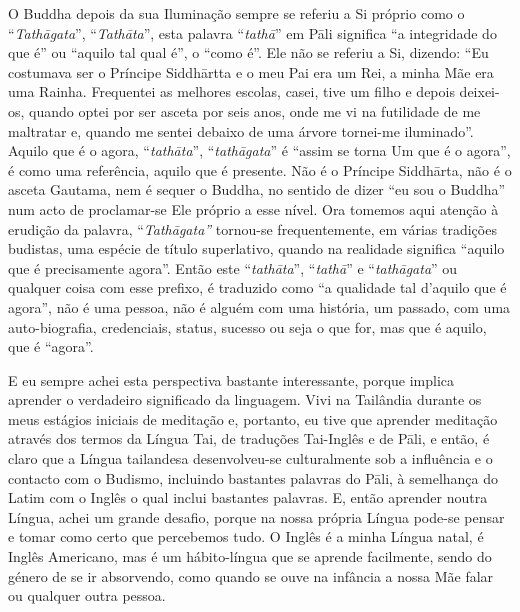 O Buddha depois da sua Iluminação sempre se referiu a Si próprio como o
``\emph{Tathāgata}'', ``\emph{Tathāta}'', esta palavra ``\emph{tathā}''
em Pāli significa ``a integridade do que é'' ou ``aquilo tal qual é'', o
``como é''. Ele não se referiu a Si, dizendo: ``Eu costumava ser o
Príncipe Siddhārtta e o meu Pai era um Rei, a minha Mãe era uma Rainha.
Frequentei as melhores escolas, casei, tive um filho e depois deixei-os,
quando optei por ser asceta por seis anos, onde me vi na futilidade de
me maltratar e, quando me sentei debaixo de uma árvore tornei-me
iluminado''. Aquilo que é o agora, ``\emph{tathāta}'',
``\emph{tathāgata}'' é ``assim se torna Um que é o agora'', é como uma
referência, aquilo que é presente. Não é o Príncipe Siddhārta, não é o
asceta Gautama, nem é sequer o Buddha, no sentido de dizer ``eu sou o
Buddha'' num acto de proclamar-se Ele próprio a esse nível. Ora tomemos
aqui atenção à erudição da palavra, ``\emph{Tathāgata''} tornou-se
frequentemente, em várias tradições budistas, uma espécie de título
superlativo, quando na realidade significa ``aquilo que é precisamente
agora''. Então este ``\emph{tathāta}'', ``\emph{tathā}'' e
``\emph{tathāgata}'' ou qualquer coisa com esse prefixo, é traduzido
como ``a qualidade tal d'aquilo que é agora'', não é uma pessoa, não é
alguém com uma história, um passado, com uma auto-biografia,
credenciais, status, sucesso ou seja o que for, mas que é aquilo, que é
``agora''.

E eu sempre achei esta perspectiva bastante interessante, porque implica
aprender o verdadeiro significado da linguagem. Vivi na Tailândia
durante os meus estágios iniciais de meditação e, portanto, eu tive que
aprender meditação através dos termos da Língua Tai, de traduções
Tai-Inglês e de Pāli, e então, é claro que a Língua tailandesa
desenvolveu-se culturalmente sob a influência e o contacto com o
Budismo, incluindo bastantes palavras do Pāli, à semelhança do Latim com
o Inglês o qual inclui bastantes palavras. E, então aprender noutra
Língua, achei um grande desafio, porque na nossa própria Língua pode-se
pensar e tomar como certo que percebemos tudo. O Inglês é a minha Língua
natal, é Inglês Americano, mas é um hábito-língua que se aprende
facilmente, sendo do género de se ir absorvendo, como quando se ouve na
infância a nossa Mãe falar ou qualquer outra pessoa.

